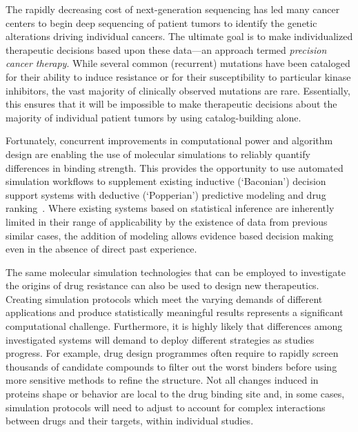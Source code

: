 The rapidly decreasing cost of next-generation sequencing has led many cancer
centers to begin deep sequencing of patient tumors to identify the genetic
alterations driving individual cancers. The ultimate goal is to make
individualized therapeutic decisions based upon these data---an approach
termed \textit{precision cancer therapy}. While several common (recurrent)
mutations have been cataloged for their ability to induce resistance or for
their susceptibility to particular kinase inhibitors, the vast majority of
clinically observed mutations are rare. Essentially, this ensures that it
will be impossible to make therapeutic decisions about the majority of
individual patient tumors by using catalog-building alone.

Fortunately, concurrent improvements in computational power and algorithm
design are enabling the use of molecular simulations to reliably quantify
differences in binding strength.
This provides the opportunity to use automated simulation workflows to
supplement existing inductive (`Baconian') decision support systems with
deductive (`Popperian') predictive modeling and drug
ranking~\cite{Marias2011, Sloot2009}. Where existing systems based on
statistical inference are inherently limited in their range of applicability
by the existence of data from previous similar cases, the addition of
modeling allows evidence based decision making even in the absence of direct
past experience.

The same molecular simulation technologies that can be employed to
investigate the origins of drug resistance can also be used to design new
therapeutics. Creating simulation protocols which meet the varying demands of
different applications and produce
statistically meaningful results represents a significant
computational challenge. Furthermore, it is highly likely that differences
among %
investigated systems %
will demand to deploy different
strategies as studies progress. For example, %
drug design programmes %
often require to rapidly screen thousands of candidate compounds to filter
out the worst binders before using more sensitive methods 
to refine the structure. Not all changes induced in proteins shape or
behavior are local to the drug binding site and, in some cases, simulation
protocols will need to adjust to account for complex interactions between
drugs and their targets, within individual studies.


